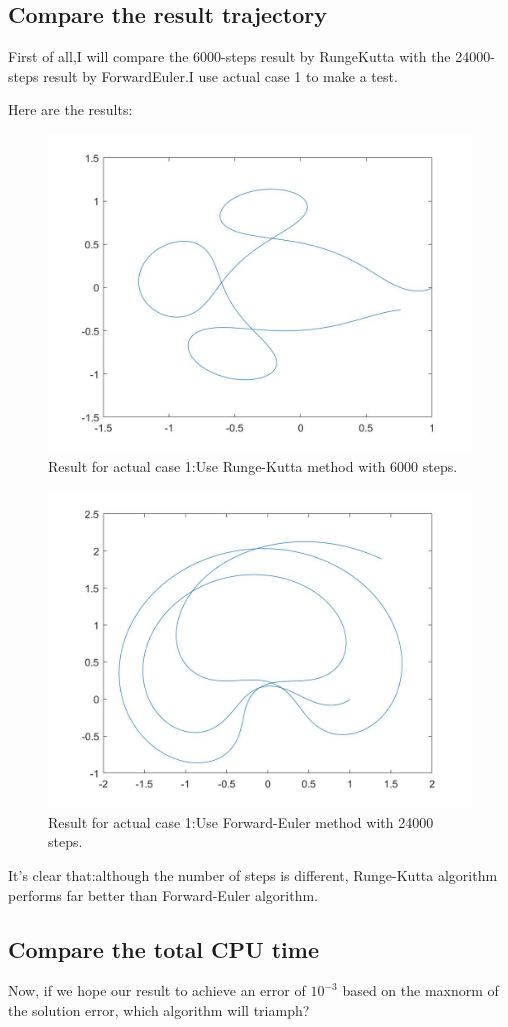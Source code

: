 \documentclass[UTF8]{ctexart}
\theoremstyle{plain}
\theoremstyle{definition}
\theoremstyle{remark}
\begin{document}
\subsection{Compare the result trajectory}
First of all,I will compare the 6000-steps result by RungeKutta with the 24000-steps result by ForwardEuler.I use actual case 1 to make a test.

Here are the results:
\begin{figure}[H]
\centering
\includegraphics[height=0.35\textheight,width=0.7\linewidth]{3}
\caption{Result for actual case 1:Use Runge-Kutta method with 6000 steps.}
\end{figure}

\begin{figure}[H]
\centering
\includegraphics[height=0.35\textheight,width=0.7\linewidth]{4}
\caption{Result for actual case 1:Use Forward-Euler method with 24000 steps.}
\end{figure}

It's clear that:although the number of steps is different, Runge-Kutta algorithm performs far better than Forward-Euler algorithm.
\subsection{Compare the total CPU time}
Now, if we hope our result to achieve an error of $10^{-3}$ based on the maxnorm of the solution error, which algorithm will triamph?
\end{document}
